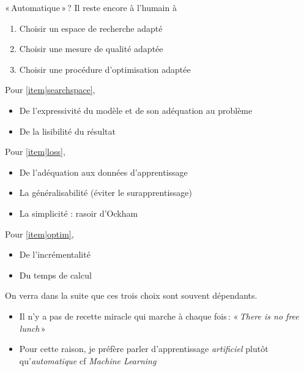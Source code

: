 \documentclass[../allslides.tex]{subfiles}
\begin{document}
\begin{frame}{« Automatique » ?}
    Il reste encore à l'humain à
    \begin{enumerate}[<alert@+>]
        \item\label{item|searchspace} Choisir un espace de recherche adapté
        \item\label{item|loss} Choisir une mesure de qualité adaptée
        \item\label{item|optim} Choisir une procédure d'optimisation adaptée
    \end{enumerate}

    \begin{overprint}
        Pour \ref{item|searchspace},
        \begin{itemize}
            \item De l'expressivité du modèle et de son adéquation au problème
            \item De la lisibilité du résultat
        \end{itemize}
        Pour \ref{item|loss},
        \begin{itemize}
            \item De l'adéquation aux données d'apprentissage
            \item La généralisabilité (éviter le surapprentissage)
            \item La simplicité : rasoir d'Ockham
        \end{itemize}
        Pour \ref{item|optim},
        \begin{itemize}
            \item De l'incrémentalité
            \item Du temps de calcul
        \end{itemize}
        On verra dans la suite que ces trois choix sont souvent dépendants.
        \begin{itemize}
            \item Il n'y a pas de recette miracle qui marche à chaque fois : « \emph{There is no free lunch} »
            \item Pour cette raison, je préfère parler d'apprentissage \emph{artificiel} plutôt qu'\emph{automatique} cf \emph{Machine Learning}
        \end{itemize}
    \end{overprint}
\end{frame}
\end{document}
